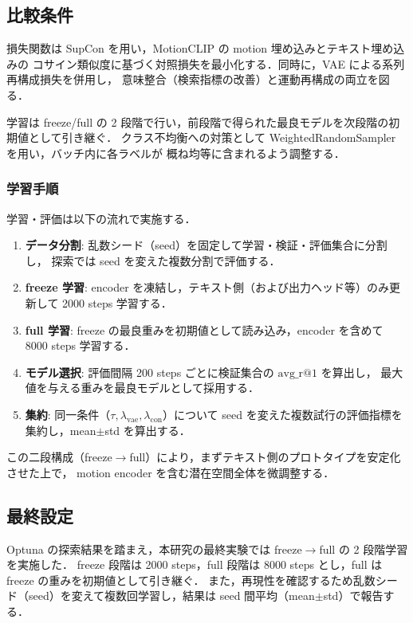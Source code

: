 \subsection{比較条件}
\label{subsec:contrastive_conditions}

損失関数は SupCon \cite{supcon} を用い，MotionCLIP の motion 埋め込みとテキスト埋め込みの
コサイン類似度に基づく対照損失を最小化する．同時に，VAE による系列再構成損失を併用し，
意味整合（検索指標の改善）と運動再構成の両立を図る．

学習は freeze/full の 2 段階で行い，前段階で得られた最良モデルを次段階の初期値として引き継ぐ．
クラス不均衡への対策として WeightedRandomSampler を用い，バッチ内に各ラベルが
概ね均等に含まれるよう調整する．

\subsubsection{学習手順}
\label{subsubsec:contrastive_procedure}

学習・評価は以下の流れで実施する．
\begin{enumerate}
  \item \textbf{データ分割}: 乱数シード（seed）を固定して学習・検証・評価集合に分割し，
    探索では seed を変えた複数分割で評価する．
  \item \textbf{freeze 学習}: encoder を凍結し，テキスト側（および出力ヘッド等）のみ更新して
    2000 steps 学習する．
  \item \textbf{full 学習}: freeze の最良重みを初期値として読み込み，encoder を含めて
    8000 steps 学習する．
  \item \textbf{モデル選択}: 評価間隔 200 steps ごとに検証集合の $\mathrm{avg\_r@1}$ を算出し，
    最大値を与える重みを最良モデルとして採用する．
  \item \textbf{集約}: 同一条件（$\tau,\lambda_{\mathrm{vae}},\lambda_{\mathrm{con}}$）について
    seed を変えた複数試行の評価指標を集約し，mean$\pm$std を算出する．
\end{enumerate}

この二段構成（freeze$\rightarrow$full）により，まずテキスト側のプロトタイプを安定化させた上で，
motion encoder を含む潜在空間全体を微調整する．

\subsection{最終設定}
\label{subsec:contrastive_final_setup}

Optuna の探索結果を踏まえ，本研究の最終実験では freeze$\rightarrow$full の 2 段階学習を実施した．
freeze 段階は 2000 steps，full 段階は 8000 steps とし，full は freeze の重みを初期値として引き継ぐ．
また，再現性を確認するため乱数シード（seed）を変えて複数回学習し，結果は seed 間平均（mean$\pm$std）で報告する．

